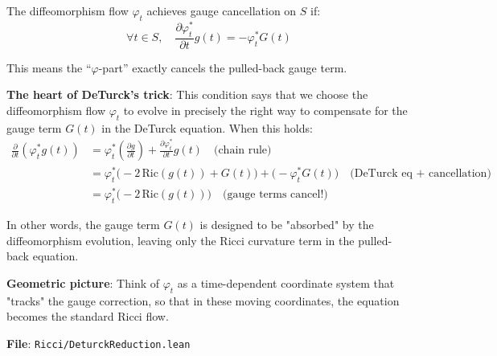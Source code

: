 \begin{definition}
\label{def:gaugeCancellationOn}
The diffeomorphism flow $\varphi_t$ achieves gauge cancellation on $S$ if:
\[ \forall t \in S, \quad \frac{\partial \varphi_t^*}{\partial t}g(t) = -\varphi_t^* G(t) \]

This means the ``$\varphi$-part'' exactly cancels the pulled-back gauge term.

\textbf{The heart of DeTurck's trick}: This condition says that we choose the diffeomorphism flow $\varphi_t$ to evolve in precisely the right way to compensate for the gauge term $G(t)$ in the DeTurck equation. When this holds:
\begin{align*}
\frac{\partial}{\partial t}(\varphi_t^* g(t))
&= \varphi_t^*\left(\frac{\partial g}{\partial t}\right) + \frac{\partial \varphi_t^*}{\partial t}g(t) \quad \text{(chain rule)} \\
&= \varphi_t^*\Big(-2\,\mathrm{Ric}(g(t)) + G(t)\Big) + \Big(-\varphi_t^* G(t)\Big) \quad \text{(DeTurck eq + cancellation)} \\
&= \varphi_t^*\Big(-2\,\mathrm{Ric}(g(t))\Big) \quad \text{(gauge terms cancel!)}
\end{align*}

In other words, the gauge term $G(t)$ is designed to be "absorbed" by the diffeomorphism evolution, leaving only the Ricci curvature term in the pulled-back equation.

\textbf{Geometric picture}: Think of $\varphi_t$ as a time-dependent coordinate system that "tracks" the gauge correction, so that in these moving coordinates, the equation becomes the standard Ricci flow.

\textbf{File}: \texttt{Ricci/DeturckReduction.lean}
\end{definition}

